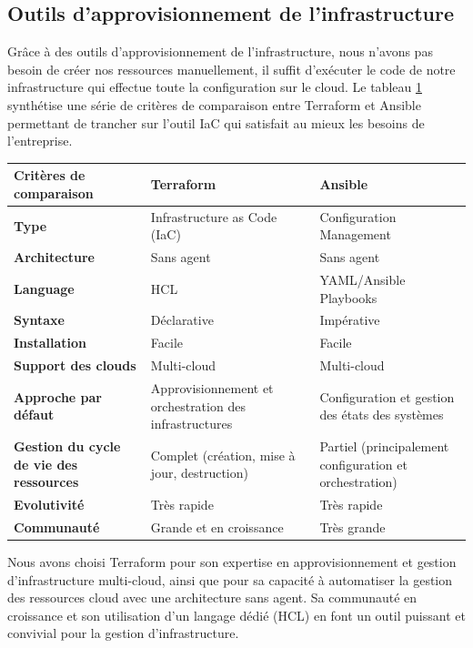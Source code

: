 \subsection{Outils d'approvisionnement de l'infrastructure}
Grâce à des outils d'approvisionnement de l'infrastructure, nous n'avons pas besoin de créer nos ressources manuellement, il suffit d'exécuter le code de notre infrastructure qui effectue toute la configuration sur le cloud.
Le tableau \ref{tableau:terraform} \cite{Kadima2024} synthétise une série de critères de comparaison entre Terraform et Ansible permettant de trancher sur l’outil IaC qui satisfait au mieux les besoins de l’entreprise.
\begin{table}[H]
\centering
\caption{Tableau comparatif des outils de gestion et d’automatisation des configurations Terraform et Ansible.}
\begin{longtable}{|p{4.5cm}|p{5.25cm}|p{5.25cm}|}
\hline
\textbf{Critères de comparaison} & \textbf{Terraform} &\textbf{Ansible} \\ 
\hline
\textbf{Type} & Infrastructure as Code (IaC) & Configuration Management \\
\hline
\textbf{Architecture} & Sans agent & Sans agent \\
\hline
\textbf{Language} & HCL & YAML/Ansible Playbooks\\
\hline
\textbf{Syntaxe} & Déclarative & Impérative \\
\hline
\textbf{Installation} & Facile & Facile \\
\hline
\textbf{Support des clouds} & Multi-cloud & Multi-cloud \\
\hline
\textbf{Approche par défaut} & Approvisionnement et orchestration des infrastructures & Configuration et gestion des états des systèmes \\
\hline
\textbf{Gestion du cycle de vie des ressources} & Complet (création, mise à jour, destruction) & Partiel (principalement configuration et orchestration) \\
\hline
\textbf{Evolutivité} & Très rapide & Très rapide \\
\hline
\textbf{Communauté} & Grande et en croissance & Très grande \\
\hline
\end{longtable}
\label{tableau:terraform}
\end{table}
Nous avons choisi Terraform pour son expertise en approvisionnement et gestion d'infrastructure multi-cloud, ainsi que pour sa capacité à automatiser la gestion des ressources cloud avec une architecture sans agent. Sa communauté en croissance et son utilisation d'un langage dédié (HCL) en font un outil puissant et convivial pour la gestion d'infrastructure.

